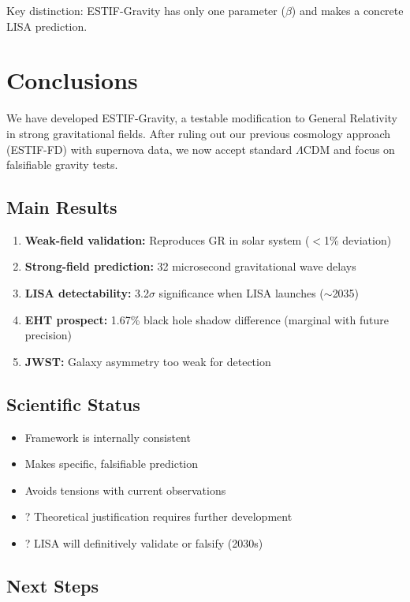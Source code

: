 \documentclass[12pt]{article}
\begin{document}
Key distinction: ESTIF-Gravity has only one parameter ($\beta$) and makes a concrete LISA prediction.

\section{Conclusions}

We have developed ESTIF-Gravity, a testable modification to General Relativity in strong gravitational fields. After ruling out our previous cosmology approach (ESTIF-FD) with supernova data, we now accept standard $\Lambda$CDM and focus on falsifiable gravity tests.

\subsection{Main Results}

\begin{enumerate}
    \item \textbf{Weak-field validation:} Reproduces GR in solar system ($<$1\% deviation)
    \item \textbf{Strong-field prediction:} 32 microsecond gravitational wave delays
    \item \textbf{LISA detectability:} 3.2$\sigma$ significance when LISA launches ($\sim$2035)
    \item \textbf{EHT prospect:} 1.67\% black hole shadow difference (marginal with future precision)
    \item \textbf{JWST:} Galaxy asymmetry too weak for detection
\end{enumerate}

\subsection{Scientific Status}

\begin{itemize}
    \item \checkmark Framework is internally consistent
    \item \checkmark Makes specific, falsifiable prediction
    \item \checkmark Avoids tensions with current observations
    \item ? Theoretical justification requires further development
    \item ? LISA will definitively validate or falsify (2030s)
\end{itemize}

\subsection{Next Steps}
\end{document}
